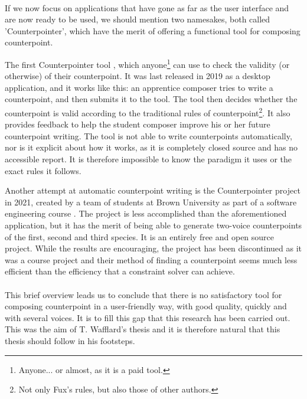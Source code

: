\paragraph{}
If we now focus on applications that have gone as far as the user interface and are now ready to be used, we should mention two namesakes, both called 'Counterpointer', which have the merit of offering a functional tool for composing counterpoint.

The first Counterpointer tool \cite{counterpointer_ms}, which anyone\footnote{Anyone... or almost, as it is a paid tool.} can use to check the validity (or otherwise) of their counterpoint. It was last released in 2019 as a desktop application, and it works like this: an apprentice composer tries to write a counterpoint, and then submits it to the tool. The tool then decides whether the counterpoint is valid according to the traditional rules of counterpoint\footnote{Not only Fux's rules, but also those of other authors.}. It also provides feedback to help the student composer improve his or her future counterpoint writing. The tool is not able to write counterpoints automatically, nor is it explicit about how it works, as it is completely closed source and has no accessible report. It is therefore impossible to know the paradigm it uses or the exact rules it follows.

Another attempt at automatic counterpoint writing is the Counterpointer project in 2021, created by a team of students at Brown University as part of a software engineering course \cite{counterpointer_project}. The project is less accomplished than the aforementioned application, but it has the merit of being able to generate two-voice counterpoints of the first, second and third species. It is an entirely free and open source project. While the results are encouraging, the project has been discontinued as it was a course project and their method of finding a counterpoint seems much less efficient than the efficiency that a constraint solver can achieve. 


\paragraph{}
This brief overview leads us to conclude that there is no satisfactory tool for composing counterpoint in a user-friendly way, with good quality, quickly and with several voices. It is to fill this gap that this research has been carried out. This was the aim of T. Wafflard's thesis and it is therefore natural that this thesis should follow in his footsteps.



